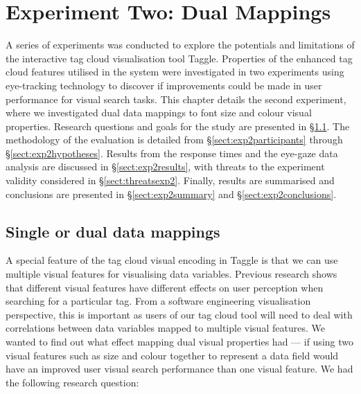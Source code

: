 \chapter[Experiment Two: Dual Mappings]{Experiment Two: Dual Mappings}
\label{chap:exp2}
\ifpdf
    \graphicspath{{Chapters/ExperimentTwo/Exp2Figs/PNG/}{Chapters/ExperimentTwo/Exp2Figs/PDF/}{Chapters/ExperimentTwo/Exp2Figs/}}
\else
    \graphicspath{{Chapters/ExperimentTwo/Exp2Figs/EPS/}{Chapters/ExperimentTwo/Exp2Figs/}}
\fi  


A series of experiments was conducted to explore the potentials and limitations of the interactive tag cloud visualisation tool Taggle. Properties of the enhanced tag cloud features utilised in the system were investigated in two experiments using eye-tracking technology to discover if improvements could be made in user performance for visual search tasks. This chapter details the second experiment, where we investigated dual data mappings to font size and colour visual properties. Research questions and goals for the study are presented in \S\ref{sect:experimenttwo}. The methodology of the evaluation is detailed from \S\ref{sect:exp2participants} through \S\ref{sect:exp2hypotheses}. Results from the response times and the eye-gaze data analysis are discussed in \S\ref{sect:exp2results}, with threats to the experiment validity considered in \S\ref{sect:threatsexp2}. Finally, results are summarised and conclusions are presented in \S\ref{sect:exp2summary} and \S\ref{sect:exp2conclusions}.

\section{Single or dual data mappings}\label{sect:experimenttwo}

A special feature of the tag cloud visual encoding in Taggle is that we can use multiple visual features for visualising data variables. Previous research \citep[][]{lohmann09, bateman08, halvey07} shows that different visual features have different effects on user perception when searching for a particular tag. From a software engineering visualisation perspective, this is important as users of our tag cloud tool will need to deal with correlations between data variables mapped to multiple visual features. We wanted to find out what effect mapping dual visual properties had --- if using two visual features such as size and colour together to represent a data field would have an improved user visual search performance than one visual feature. We had the following research question: 

